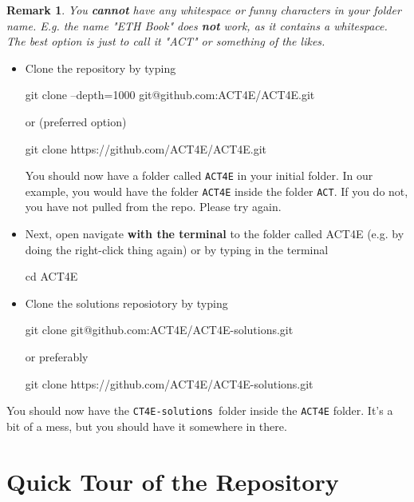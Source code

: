 \documentclass{article}
\newtheorem{remark}{Remark}
\begin{document}
\begin{remark}
    You \textbf{cannot} have any whitespace or funny characters in your folder name. E.g. the name "ETH Book" does \textbf{not} work, as it contains a whitespace. The best option is just to call it "ACT" or something of the likes.
\end{remark}
\begin{itemize}
    \item Clone the repository by typing
\begin{bashcode}
  git clone --depth=1000 git@github.com:ACT4E/ACT4E.git
\end{bashcode}
or (preferred option)
\begin{bashcode}
  git clone https://github.com/ACT4E/ACT4E.git
\end{bashcode}
You should now have a folder called \texttt{ACT4E} in your initial folder. In our example, you would have the folder \texttt{ACT4E} inside the folder \texttt{ACT}. If you do not, you have not pulled from the repo. Please try again.
\item Next, open navigate \textbf{with the terminal} to the folder called ACT4E (e.g. by doing the right-click thing again) or by typing in the terminal
\begin{bashcode}
  cd ACT4E
\end{bashcode}
\item Clone the solutions reposiotory by typing
\begin{bashcode}
 git clone git@github.com:ACT4E/ACT4E-solutions.git
\end{bashcode}
or preferably
\begin{bashcode}
  git clone https://github.com/ACT4E/ACT4E-solutions.git
\end{bashcode}
\end{itemize}
You should now have the \texttt{CT4E-solutions} folder inside the \texttt{ACT4E} folder. It's a bit of a mess, but you should have it somewhere in there.

\section{Quick Tour of the Repository}
\end{document}
